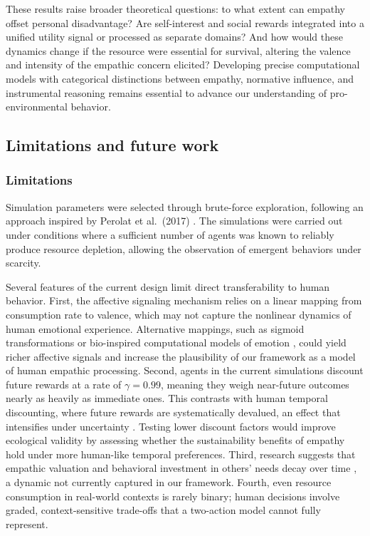 These results raise broader theoretical questions: to what extent can empathy offset personal disadvantage? Are self-interest and social rewards integrated into a unified utility signal or processed as separate domains? And how would these dynamics change if the resource were essential for survival, altering the valence and intensity of the empathic concern elicited? Developing precise computational models with categorical distinctions between empathy, normative influence, and instrumental reasoning remains essential to advance our understanding of pro-environmental behavior.


\subsection{Limitations and future work}
\subsubsection{Limitations}
Simulation parameters were selected through brute-force exploration, following an approach inspired by Perolat et al.\ (2017) \cite{perolatMultiagentReinforcementLearning2017}. The simulations were carried out under conditions where a sufficient number of agents was known to reliably produce resource depletion, allowing the observation of emergent behaviors under scarcity.

Several features of the current design limit direct transferability to human behavior. First, the affective signaling mechanism relies on a linear mapping from consumption rate to valence, which may not capture the nonlinear dynamics of human emotional experience. Alternative mappings,  such as sigmoid transformations or bio-inspired computational models of emotion \cite{gannouniAdaptiveEmotionDetection2020,joffilyEmotionalValenceFreeenergy2013},  could yield richer affective signals and increase the plausibility of our framework as a model of human empathic processing. Second, agents in the current simulations discount future rewards at a rate of $\gamma = 0.99$, meaning they weigh near-future outcomes nearly as heavily as immediate ones. This contrasts with human temporal discounting, where future rewards are systematically devalued, an effect that intensifies under uncertainty \cite{storyDiscountingFutureReward2024}. Testing lower discount factors would improve ecological validity by assessing whether the sustainability benefits of empathy hold under more human-like temporal preferences. Third, research suggests that empathic valuation and behavioral investment in others' needs decay over time \cite{colemanIntertemporalEmpathyDecline2024}, a dynamic not currently captured in our framework. Fourth, even resource consumption in real-world contexts is rarely binary; human decisions involve graded, context-sensitive trade-offs that a two-action model cannot fully represent.

